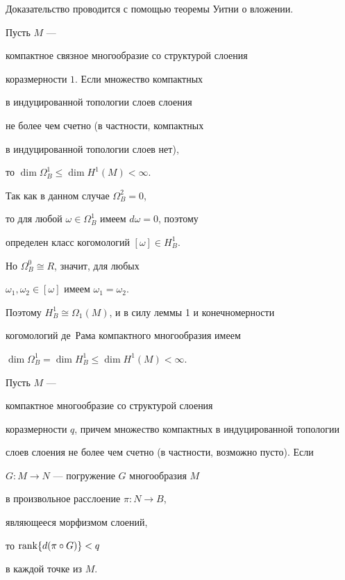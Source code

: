 Доказательство проводится с помощью теоремы Уитни о вложении.





\begin{cor} \label{}


Пусть $M$ ---


компактное связное многообразие со структурой слоения


коразмерности $1$. Если множество компактных


в индуцированной топологии слоев слоения


не более чем счетно (в частности, компактных


в индуцированной топологии слоев нет),


то $\dim \Omega_{B}^1 \leq \dim H^1(M) < \infty$.


\end{cor}





Так как в данном случае $\Omega_B^2=0$,


то для любой $\omega \in \Omega_B^1$ имеем $d\omega = 0$, поэтому


определен класс когомологий $[\omega] \in H^1_B$.


Но $\Omega_B^0 \cong R$, значит, для любых


$\omega_1, \omega_2 \in [\omega]$ имеем $\omega_1 = \omega_2$.


Поэтому $H^1_B \cong \Omega_1(M)$, и в силу леммы 1 и конечномерности


когомологий де~Рама компактного многообразия имеем


$\dim\Omega_B^1 = \dim H^1_B \le \dim H^1(M) < \infty$.





\begin{cor} \label{}


Пусть $M$ ---


компактное многообразие со структурой слоения


коразмерности $q$, причем множество компактных в индуцированной топологии


слоев слоения не более чем счетно (в частности, возможно пусто). Если


$G : M \to N$ --- погружение $G$ многообразия $M$


в произвольное расслоение $\pi : N \to B$,


являющееся морфизмом слоений,


то $\operatorname{rank}\{ d(\pi\circ G) \} < q$


в каждой точке из $M$.


\end{cor}





